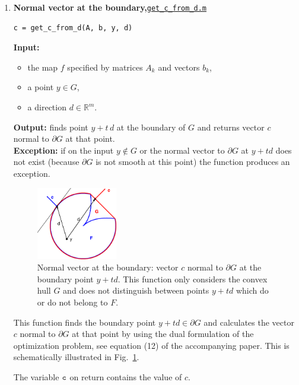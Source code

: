 \documentclass[a4paper]{article}
\newcommand{\R}{\mathbb{R}}
\theoremstyle{definition}
\begin{document}
\begin{enumerate}
\newpage

\item {\bf Normal vector at the boundary,\hskip 6pt}\underline{\tt get\_c\_from\_d.m} 
\begin{verbatim}
c = get_c_from_d(A, b, y, d)
\end{verbatim}
{\bf Input:}
\begin{itemize}
	\item the map $f$ specified by matrices $A_k$ and vectors $b_k$,
	\item a point $y\in G$,
	\item a direction $d\in\R^m$.
\end{itemize}
{\bf Output:}  finds point $y+t\,d$ at the boundary of $G$ and returns vector $c$ normal to $\partial G$ at that point.\\
{\bf Exception:} if on the input $y\notin G$ or the normal vector to $\partial G$ at $y+td$ does not exist (because $\partial G$ is not smooth at this point)  the function produces an exception.


\begin{figure}[H]
	\centering\includegraphics[width=100pt]{fig/get_c_from_d}
	\caption{Normal vector at the boundary: vector $c$ normal to $\partial G$ at the boundary point $y+td$. This function only considers the convex hull $G$ and does not distinguish between points $y+td$ which do or do not belong to $F$.}
\label{fig:three}
\end{figure}

This function finds the boundary point $y+td\in \partial G$ and calculates the vector $c$ normal to $\partial G$ at that point by using the dual formulation of the optimization problem, see equation (12) of the accompanying paper.
This is schematically illustrated in Fig.~\ref{fig:three}.

The variable $\tt c$ on return contains the value of $c$.

\newpage


\end{enumerate}
\end{document}
